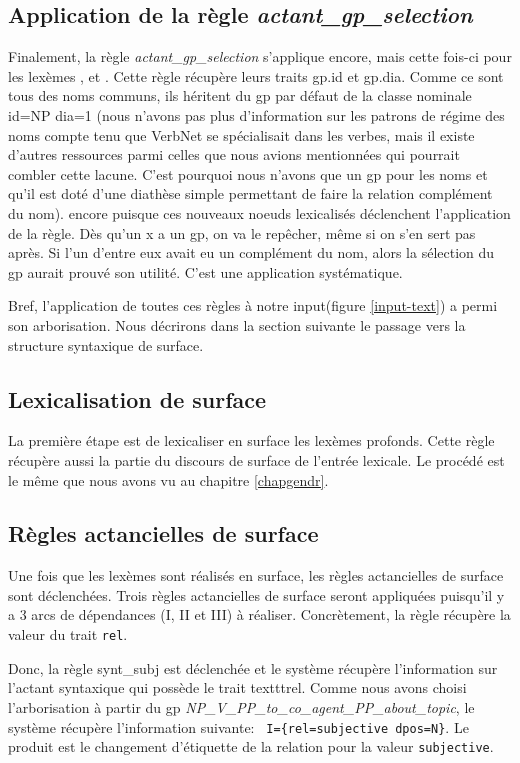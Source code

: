 \subsection{Application de la règle \emph{actant\_gp\_selection}}
Finalement, la règle \emph{actant\_gp\_selection} s'applique encore, mais cette fois-ci pour les lexèmes , et . Cette règle récupère leurs traits gp.id et gp.dia. Comme ce sont tous des noms communs, ils héritent du gp par défaut de la classe nominale id=NP dia=1 (nous n'avons pas plus d'information sur les patrons de régime des noms compte tenu que VerbNet se spécialisait dans les verbes, mais il existe d'autres ressources parmi celles que nous avions mentionnées qui pourrait combler cette lacune. C'est pourquoi nous n'avons que un gp pour les noms et qu'il est doté d'une diathèse simple permettant de faire la relation complément du nom). encore puisque ces nouveaux noeuds lexicalisés déclenchent l'application de la règle. Dès qu'un x a un gp, on va le repêcher, même si on s'en sert pas après. Si l'un d'entre eux avait eu un complément du nom, alors la sélection du gp aurait prouvé son utilité. C'est une application systématique.

Bref, l'application de toutes ces règles à notre input(figure \ref{input-text}) a permi son arborisation. Nous décrirons dans la section suivante le passage vers la structure syntaxique de surface.

\subsection{Lexicalisation de surface}
La première étape est de lexicaliser en surface les lexèmes profonds. Cette règle récupère aussi la partie du discours de surface de l'entrée lexicale. Le procédé est le même que nous avons vu au chapitre \ref{chapgendr}.

\subsection{Règles actancielles de surface}
Une fois que les lexèmes sont réalisés en surface, les règles actancielles de surface sont déclenchées. Trois règles actancielles de surface seront appliquées puisqu'il y a 3 arcs de dépendances (I, II et III) à réaliser. Concrètement, la règle récupère la valeur du trait \texttt{rel}. 

Donc, la règle synt\_subj est déclenchée et le système récupère l'information sur l'actant syntaxique qui possède le trait texttt{rel}. Comme nous avons choisi l'arborisation à partir du gp \emph{NP\_V\_PP\_to\_co\_agent\_PP\_about\_topic}, le système récupère l'information suivante: \lstinline! I={rel=subjective dpos=N}!. Le produit est le changement d'étiquette de la relation pour la valeur \texttt{subjective}.

